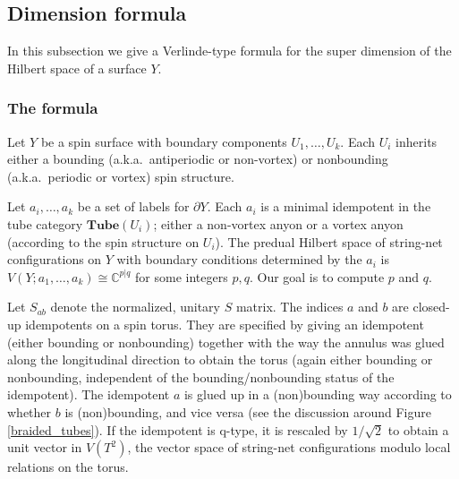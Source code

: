 \documentclass[12pt,a4paper]{article}
\newcommand{\cc}{\mathbb{C}}
\newcommand{\mcc}{\mathcal{C}}
\newcommand{\tube}{\textbf{Tube}}
\newcommand{\bd}{\partial}
\newcommand{\ethan}[1]{{\color{amethyst}\footnotesize{(EL) #1}}}
\begin{document}
 %


\subsection{Dimension formula}

In this subsection we give a Verlinde-type formula for the super dimension of the Hilbert space of a surface $Y$.


\subsubsection{The formula}

Let $Y$ be a spin surface with boundary components $U_1, \ldots, U_k$.
Each $U_i$ inherits either a bounding (a.k.a.\ antiperiodic or non-vortex) or nonbounding 
(a.k.a.\ periodic or vortex) spin structure.

Let $a_i,\ldots, a_k$ be a set of labels for $\bd Y$.
Each $a_i$ is a minimal idempotent in the tube category $\tube(U_i)$; either a non-vortex anyon or a vortex anyon
(according to the spin structure on $U_i$).
The predual Hilbert space of string-net configurations on $Y$ with boundary conditions determined by the $a_i$ is $V(Y; a_1,\ldots, a_k) \cong \cc^{p|q}$ for some integers $p,q$.
Our goal is to compute $p$ and $q$.

\medskip

Let $S_{ab}$ denote the normalized, unitary $S$ matrix.
The indices $a$ and $b$ are closed-up idempotents on a spin torus.
They are specified by giving an idempotent (either bounding or nonbounding) together with
the way the annulus was glued along the longitudinal direction to obtain the torus (again either bounding or nonbounding,
independent of the bounding/nonbounding status of the idempotent).
The idempotent $a$ is glued up in a (non)bounding way according to whether $b$ is (non)bounding, and vice versa (see the discussion around Figure \ref{braided_tubes}).
If the idempotent is q-type, it is rescaled by $1/\sqrt 2$ to obtain a unit vector in $V(T^2)$, the vector space of string-net configurations modulo local relations on the torus.
\end{document}
